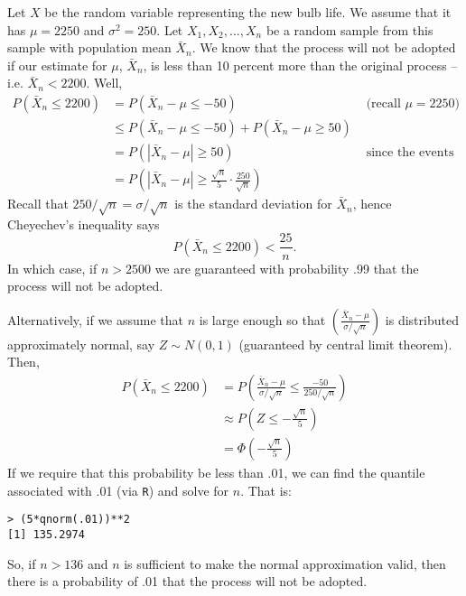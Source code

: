 \documentclass{homework}
\begin{document}
\begin{solution}
  Let $X$ be the random variable representing the new bulb life.  We assume that it has $\mu = 2250$ and $\sigma^2 = 250$. Let $X_1,X_2,...,X_n$ be a random sample from this sample with population mean $\bar X_n$.  We know that the process will not be adopted if our estimate for $\mu$, $\bar X_n$, is less than 10 percent more than the original process --  i.e. $\bar X_n < 2200$. Well,
  \begin{align*}
  P(\bar X_n \le 2200) 
  &= P(\bar X_n - \mu \le -50)& \text{ (recall $\mu = 2250$)}\\
  &\le P(\bar X_n - \mu \le -50) + P(\bar X_n -\mu \ge 50) \\
  &= P(|\bar X_n -\mu| \ge 50)& \text{ since the events are disjoint,}\\
  &= P\left(|\bar X_n -\mu| \ge \frac{\sqrt n}{5} \cdot \frac{250}{\sqrt n}\right)
  \end{align*}
  Recall that $250/\sqrt n = \sigma /\sqrt n$ is the standard deviation for $\bar X_n$, hence Cheyechev's inequality says
  $$
  P(\bar X_n \le 2200) < \frac{25}n.
  $$
  In which case, if $n > 2500$ we are guaranteed with probability .99 that the process will not be adopted.

  Alternatively, if we assume that $n$ is large enough so that $\left(\frac{\bar X_n - \mu}{\sigma/\sqrt n}\right)$ is distributed approximately normal, say $Z\sim N(0,1)$ (guaranteed by central limit theorem). Then,
  \begin{align*}
  P(\bar X_n \le 2200) 
  &= P\left( \frac{\bar X_n- \mu}{\sigma/\sqrt n} \le \frac{-50}{250/\sqrt n}\right) \\
  &\approx P\left( Z \le -\frac{\sqrt n}{5}\right)\\
  &= \Phi\left(-\frac{\sqrt n}{5}\right)
  \end{align*}
  If we require that this probability be less than .01, we can find the quantile associated with .01 (via \texttt{R}) and solve for $n$.  That is: 
  \begin{verbatim}
> (5*qnorm(.01))**2 
[1] 135.2974
  \end{verbatim}
  So, if $n> 136$ and $n$ is sufficient to make the normal approximation valid, then there is a probability of .01 that the process will not be adopted. 
\end{solution}
\end{document}
